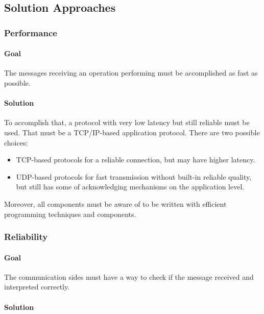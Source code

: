 \subsection{Solution Approaches}\label{solution-approaches}

\subsubsection{Performance}\label{performance}

\paragraph{Goal}\label{goal}

The messages receiving an operation performing must be accomplished as
fast as possible.

\paragraph{Solution}\label{solution}

To accomplish that, a protocol with very low latency but still reliable
must be used. That must be a TCP/IP-based application protocol. There
are two possible choices:

\begin{itemize}
\tightlist
\item
  TCP-based protocols for a reliable connection, but may have higher
  latency.
\item
  UDP-based protocols for fast transmission without built-in reliable
  quality, but still has some of acknowledging mechanisms on the
  application level.
\end{itemize}

Moreover, all components must be aware of to be written with efficient
programming techniques and components.

\subsubsection{Reliability}\label{reliability}

\paragraph{Goal}\label{goal-1}

The communication sides must have a way to check if the message received
and interpreted correctly.

\paragraph{Solution}\label{solution-1}

